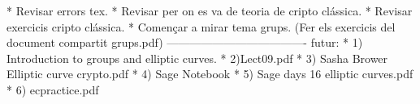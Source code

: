 * Revisar errors tex.
* Revisar per on es va de teoria de cripto clássica.
* Revisar exercicis cripto clássica.
* Començar a mirar tema grups. (Fer els exercicis del document compartit grups.pdf)
-------------------------------------
futur:
* 1) Introduction to groups and elliptic curves. 
* 2)Lect09.pdf
* 3) Sasha Brower Elliptic curve crypto.pdf
* 4) Sage Notebook
* 5) Sage days 16 elliptic curves.pdf
* 6) ecpractice.pdf

